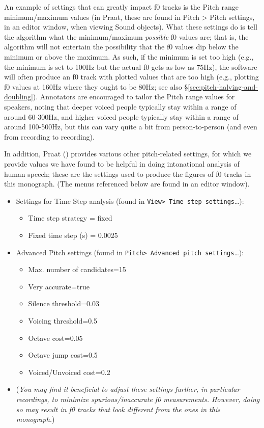 \documentclass[11pt, twoside]{memoir}
\begin{document}
An example of settings that can greatly impact f0 tracks is the Pitch range minimum\slash maximum values (in Praat, these are found in Pitch > Pitch settings, in an editor window, when viewing Sound objects). What these settings do is tell the algorithm what the minimum\slash maximum \emph{possible} f0 values are; that is, the algorithm will not entertain the possibility that the f0 values dip below the minimum or above the maximum. As such, if the minimum is set too high (e.g., the minimum is set to 100Hz but the actual f0 gets as low as 75Hz), the software will often produce an f0 track with plotted values that are too high (e.g., plotting f0 values at 160Hz where they ought to be 80Hz; see also §\ref{sec:pitch-halving-and-doubling}). Annotators are encouraged to tailor the Pitch range values for speakers, noting that deeper voiced people typically stay within a range of around 60-300Hz, and higher voiced people typically stay within a range of around 100-500Hz, but this can vary quite a bit from person-to-person (and even from recording to recording).

In addition, Praat (\citealt{praat}) provides various other pitch-related settings, for which we provide values we have found to be helpful in doing intonational analysis of human speech; these are the settings used to produce the figures of f0 tracks in this monograph. (The menus referenced below are found in an editor window).

\begin{itemize}
\item Settings for Time Step analysis (found in \texttt{View> Time step settings}\ldots):
	\begin{itemize}
		\item Time step strategy = fixed
		\item Fixed time step (s) = 0.0025
	\end{itemize} 
\item Advanced Pitch settings (found in \texttt{Pitch> Advanced pitch settings}\ldots):
	\begin{itemize}
		\item Max. number of candidates=15
		\item Very accurate=true
		\item Silence threshold=0.03
		\item Voicing threshold=0.5
		\item Octave cost=0.05
		\item Octave jump cost=0.5
		\item Voiced/Unvoiced cost=0.2
	\end{itemize}
\item[] (\textit{You may find it beneficial to adjust these settings further, in particular recordings, to minimize spurious\slash inaccurate f0 measurements. However, doing so may result in f0 tracks that look different from the ones in this monograph.})
\end{itemize}
\end{document}

